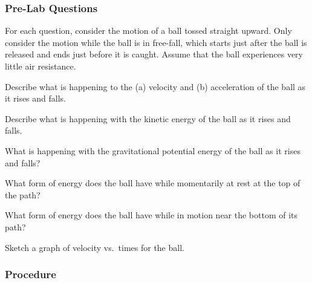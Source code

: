 \documentclass{article}
\numberwithin{equation}{section}
\numberwithin{figure}{section}
\begin{document}
\subsubsection*{Pre-Lab Questions}
For each question, consider the motion of a ball tossed straight upward. Only consider the motion while the ball is in free-fall, which starts just after the ball is released and ends just before it is caught. Assume that the ball experiences very little air resistance.

\begin{exercise}
    Describe what is happening to the (a) velocity and (b) acceleration of the ball as it rises and falls.
\end{exercise}

\begin{exercise}
    Describe what is happening with the kinetic energy of the ball as it rises and falls.
\end{exercise}

\begin{exercise}
    What is happening with the gravitational potential energy of the ball as it rises and falls?
\end{exercise}

\begin{exercise}
    What form of energy does the ball have while momentarily at rest at the top of the path?
\end{exercise}

\begin{exercise}
    What form of energy does the ball have while in motion near the bottom of its path?
\end{exercise}

\begin{exercise}
    Sketch a graph of velocity vs.~times for the ball. 
\end{exercise}

\subsubsection*{Procedure}
\end{document}
